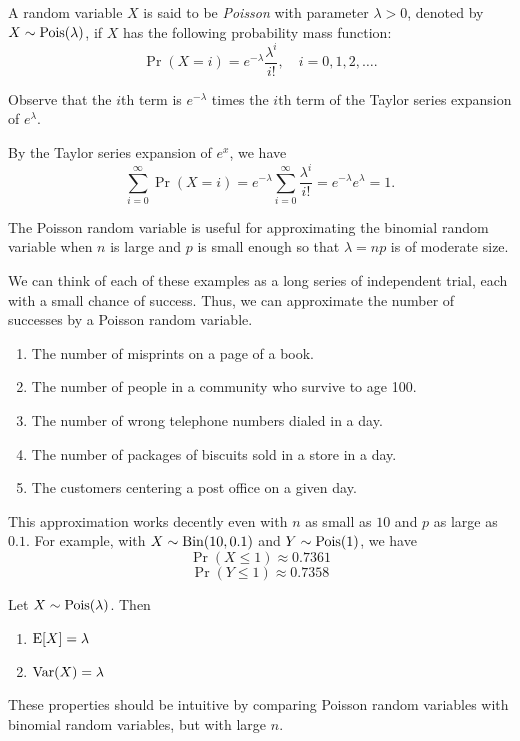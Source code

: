 \documentclass{article}
\begin{document}
\begin{definition}
  A random variable $X$ is said to be \emph{Poisson} with parameter $\lambda > 0$, denoted by $X \sim \textnormal{Pois}(\lambda)$, if $X$ has the following probability mass function:
  \[
    \Pr(X = i) = e^{-\lambda} \frac{\lambda^i}{i!}, \quad i = 0, 1, 2, \ldots.
  \]
\end{definition}
Observe that the $i$th term is $e^{-\lambda}$ times the $i$th term of the Taylor series expansion of $e^\lambda$.

\begin{remark}
  By the Taylor series expansion of $e^x$, we have
  \[
    \sum_{i = 0}^\infty \Pr(X = i) = e^{-\lambda} \sum_{i = 0}^\infty \frac{\lambda^i}{i!} = e^{-\lambda} e^\lambda = 1.
  \]
\end{remark}

The Poisson random variable is useful for approximating the binomial random variable when $n$ is large and $p$ is small enough so that $\lambda = np$ is of moderate size.

\begin{example}
  We can think of each of these examples as a long series of independent trial, each with a small chance of success.
  Thus, we can approximate the number of successes by a Poisson random variable.
  \begin{enumerate}
    \item The number of misprints on a page of a book.
    \item The number of people in a community who survive to age 100.
    \item The number of wrong telephone numbers dialed in a day.
    \item The number of packages of biscuits sold in a store in a day.
    \item The customers centering a post office on a given day.
  \end{enumerate}
\end{example}

\begin{remark}
  This approximation works decently even with $n$ as small as $10$ and $p$ as large as $0.1$.
  For example, with $X \sim \textnormal{Bin}(10, 0.1)$ and $Y \sim \textnormal{Pois}(1)$, we have
  \[
    \Pr(X \leq 1) \approx 0.7361
  \]
  \[
    \Pr(Y \leq 1) \approx 0.7358
  \]
\end{remark}

\begin{theorem}
  Let $X \sim \textnormal{Pois}(\lambda)$.
  Then
  \begin{enumerate}
    \item $\operatorname{E}[X] = \lambda$
    \item $\operatorname{Var}(X) = \lambda$
  \end{enumerate}
\end{theorem}
These properties should be intuitive by comparing Poisson random variables with binomial random variables, but with large $n$.
\end{document}

